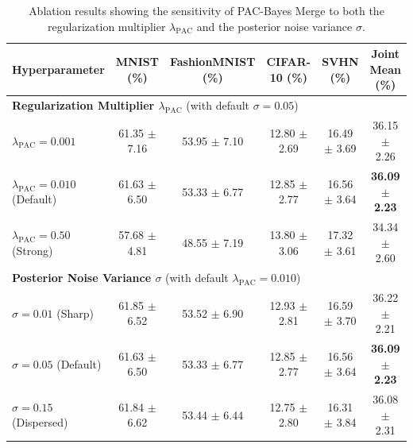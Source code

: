\begin{table}[ht]
\caption{Ablation results showing the sensitivity of PAC-Bayes Merge to both the regularization multiplier $\lambda_{\text{PAC}}$ and the posterior noise variance $\sigma$.}
\label{tab:ablation_results}
\vskip 0.15in
\begin{center}
\begin{small}
\begin{sc}
\begin{tabular}{lccccc}
\toprule
Hyperparameter & MNIST (\%) & FashionMNIST (\%) & CIFAR-10 (\%) & SVHN (\%) & Joint Mean (\%) \\
\midrule
\multicolumn{6}{l}{\textbf{Regularization Multiplier $\lambda_{\text{PAC}}$} (with default $\sigma = 0.05$)} \\
$\lambda_{\text{PAC}} = 0.001$ & 61.35 $\pm$ 7.16 & 53.95 $\pm$ 7.10 & 12.80 $\pm$ 2.69 & 16.49 $\pm$ 3.69 & 36.15 $\pm$ 2.26 \\
$\lambda_{\text{PAC}} = 0.010$ (Default) & 61.63 $\pm$ 6.50 & 53.33 $\pm$ 6.77 & 12.85 $\pm$ 2.77 & 16.56 $\pm$ 3.64 & \textbf{36.09 $\pm$ 2.23} \\
$\lambda_{\text{PAC}} = 0.50$ (Strong) & 57.68 $\pm$ 4.81 & 48.55 $\pm$ 7.19 & 13.80 $\pm$ 3.06 & 17.32 $\pm$ 3.61 & 34.34 $\pm$ 2.60 \\
\midrule
\multicolumn{6}{l}{\textbf{Posterior Noise Variance $\sigma$} (with default $\lambda_{\text{PAC}} = 0.010$)} \\
$\sigma = 0.01$ (Sharp) & 61.85 $\pm$ 6.52 & 53.52 $\pm$ 6.90 & 12.93 $\pm$ 2.81 & 16.59 $\pm$ 3.70 & 36.22 $\pm$ 2.21 \\
$\sigma = 0.05$ (Default) & 61.63 $\pm$ 6.50 & 53.33 $\pm$ 6.77 & 12.85 $\pm$ 2.77 & 16.56 $\pm$ 3.64 & \textbf{36.09 $\pm$ 2.23} \\
$\sigma = 0.15$ (Dispersed) & 61.84 $\pm$ 6.62 & 53.44 $\pm$ 6.44 & 12.75 $\pm$ 2.80 & 16.31 $\pm$ 3.84 & 36.08 $\pm$ 2.31 \\
\bottomrule
\end{tabular}
\end{sc}
\end{small}
\end{center}
\vskip -0.1in
\end{table}

